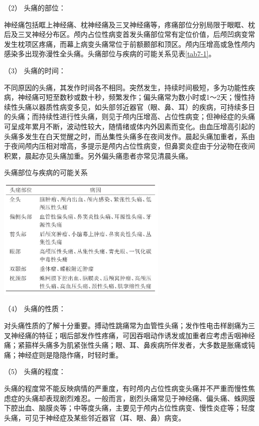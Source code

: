 \hypertarget{text00020.htmlux5cux23CHP1-7-2-1-1-2}{}
（2） 头痛的部位：

神经痛包括眶上神经痛、枕神经痛及三叉神经痛等，疼痛部位分别局限于眼眶、枕后及三叉神经分布区。颅内占位性病变首发头痛部位常有定位价值，后颅凹病变常发生枕项区疼痛，而幕上病变头痛常位于前额颞部和顶区。颅内压增高或急性颅内感染多出现弥漫性全头痛。头痛部位与疾病的可能关系见表\ref{tab7-1}。

\hypertarget{text00020.htmlux5cux23CHP1-7-2-1-1-3}{}
（3） 头痛的时间：

不同原因的头痛，其发作时间各不相同。突然发生，持续时间极短，多为功能性疾病，神经痛可短至数秒或数十秒，频繁发作；偏头痛常为数小时或1～2天；慢性持续性头痛以器质性病变多见，如头部邻近器官（眼、鼻、耳）的疾病，可持续多日的头痛；而持续性进行性头痛，则见于颅内压增高、占位性病变；但神经症的头痛可呈成年累月不断，波动性较大，随情绪或体内外因素而变化。由血压增高引起的头痛多发生在白天觉醒之时，而丛集性头痛多在夜间发作。晨起头痛加重者，系由于夜间颅内压相对增高，多提示是颅内占位性病变，但鼻窦炎症由于分泌物在夜间积累，晨起亦见头痛加重。另外偏头痛患者亦常见清晨头痛。

\begin{table}[htbp]
\centering
\caption{头痛部位与疾病的可能关系}
\label{tab7-1}
\includegraphics[width=3.21875in,height=2.30208in]{./images/Image00039.jpg}
\end{table}

\hypertarget{text00020.htmlux5cux23CHP1-7-2-1-1-4}{}
（4） 头痛的性质：

对头痛性质的了解十分重要。搏动性跳痛常为血管性头痛；发作性电击样剧痛为三叉神经痛的特征；咽后部发作性疼痛，可因吞咽动作诱发或加重者应考虑舌咽神经痛；紧箍样头痛多为肌紧张性头痛；眼、耳、鼻疾病所伴发者，大多数是胀痛或钝痛；神经症则是隐隐作痛，时轻时重。

\hypertarget{text00020.htmlux5cux23CHP1-7-2-1-1-5}{}
（5） 头痛的程度：

头痛的程度常不能反映病情的严重度，有时颅内占位性病变头痛并不严重而慢性焦虑症的头痛却表现剧烈难忍。一般而言，剧烈头痛常见于神经痛、偏头痛、蛛网膜下腔出血、脑膜炎等；中等度头痛，主要见于颅内占位性病变、慢性炎症等；轻度头痛，可见于神经症及某些邻近器官（耳、眼、鼻）病变。

